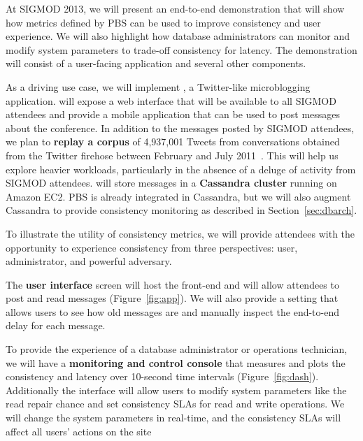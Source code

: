 At SIGMOD 2013, we will present an end-to-end demonstration that will
show how metrics defined by PBS can be used to improve consistency and
user experience. We will also highlight how database administrators
can monitor and modify system parameters to trade-off consistency for
latency. The demonstration will consist of a user-facing application
and several other components.


As a driving use case, we will implement \textbf{{\systemname}}, a
Twitter-like microblogging application. {\systemname} will expose a
web interface that will be available to all SIGMOD attendees and
provide a mobile application that can be used to post messages about
the conference. In addition to the messages posted by SIGMOD
attendees, we plan to \textbf{replay a corpus} of 4,937,001 Tweets
from conversations obtained from the Twitter firehose between February
and July 2011~\cite{ritter2010unsupervised}. This will help us explore
heavier workloads, particularly in the absence of a deluge of activity
from SIGMOD attendees. {\systemname} will store messages in a
\textbf{Cassandra cluster} running on Amazon EC2. PBS is already
integrated in Cassandra, but we will also augment Cassandra to provide
consistency monitoring as described in Section~\ref{sec:dbarch}.


To illustrate the utility of consistency metrics, we will provide
attendees with the opportunity to experience consistency from three
perspectives: user, administrator, and powerful adversary.

The \textbf{user interface} screen will host the {\systemname}
front-end and will allow attendees to post and read messages
(Figure~\ref{fig:app}). We will also provide a setting that
allows users to see how old messages are and manually inspect the
end-to-end delay for each message. %

To provide the experience of a database administrator or operations
technician, we will have a \textbf{monitoring and control console}
that measures and plots the consistency and latency over 10-second
time intervals (Figure~\ref{fig:dash}).
Additionally the interface will allow users to modify system parameters like
the read repair chance and set consistency SLAs for read and write
operations. We will change the system parameters in real-time, and the
consistency SLAs will affect all users' actions on the site

